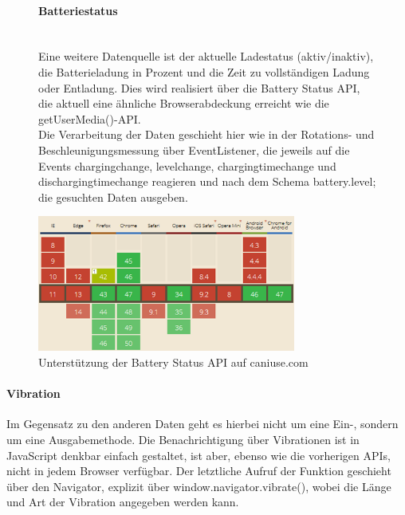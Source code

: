\documentclass[a4paper]{spie}  %
\begin{document}


\begin{figure}[H]
\begin{minipage}[t]{0.4\textwidth}
\vspace{0pt}
\paragraph{Batteriestatus}\mbox{}\\
Eine weitere Datenquelle ist der aktuelle Ladestatus (aktiv/inaktiv), die Batterieladung in Prozent und die Zeit zu vollständigen Ladung oder Entladung. Dies wird realisiert über die Battery Status API, die aktuell eine ähnliche Browserabdeckung erreicht wie die getUserMedia()-API.\\
Die Verarbeitung der Daten geschieht hier wie in der Rotations- und Beschleunigungsmessung über EventListener, die jeweils auf die Events chargingchange, levelchange, chargingtimechange und dischargingtimechange reagieren und nach dem Schema battery.level; die gesuchten Daten ausgeben.

\end{minipage}
\hfill
\begin{minipage}[t]{0.5\textwidth}
\vspace{0pt}
    \includegraphics[width=8.5cm]{images/caniuseBatteryStatusAPI}
     \caption{Unterstützung der Battery Status API auf caniuse.com}
		\label{fig:test2}
\end{minipage}
\end{figure}

\paragraph{Vibration}
Im Gegensatz zu den anderen Daten geht es hierbei nicht um eine Ein-, sondern um eine Ausgabemethode. Die Benachrichtigung über Vibrationen ist in JavaScript denkbar einfach gestaltet, ist aber, ebenso wie die vorherigen APIs, nicht in jedem Browser verfügbar. Der letztliche Aufruf der Funktion geschieht über den Navigator, explizit über window.navigator.vibrate(), wobei die Länge und Art der Vibration angegeben werden kann.
\end{document}
